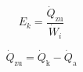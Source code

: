 

\item[d)] 
    \[
    E_k = \frac{\dot{Q}_{\text{zu}}}{\dot{W}_i}
    \]
    
    \[
    \dot{Q}_{\text{zu}} = \dot{Q}_{\text{k}} - \dot{Q}_{\text{a}}
    \]